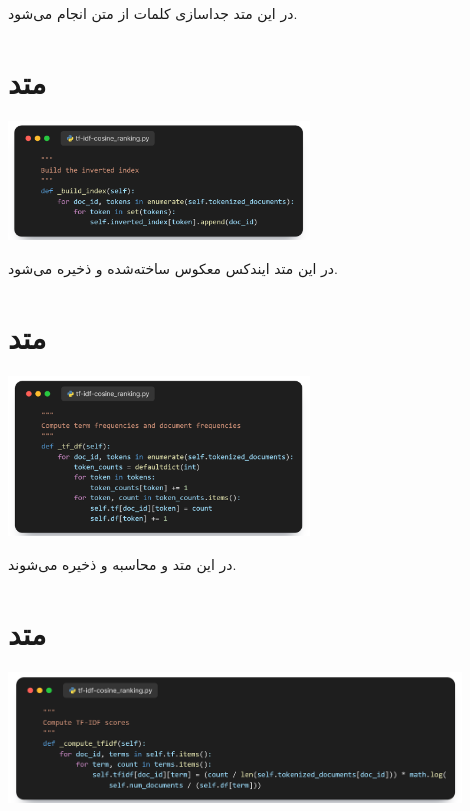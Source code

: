 \documentclass[12pt, dvipsnames, svgnames, x11names,]{article}
\begin{document}
		{\normalsize 
			در این متد جداسازی کلمات از متن انجام می‌شود.
		}
		
	\section{متد }
	
		\begin{center}
			{\includegraphics[width=8cm]{images/05.png}}
		\end{center}
	
		{\normalsize 
			در این متد ایندکس معکوس ساخته‌شده و ذخیره می‌شود.
		}
		
	\section{متد }
		
		\begin{center}
			{\includegraphics[width=8cm]{images/06.png}}
		\end{center}
		
		{\normalsize 
			در این متد  و  محاسبه و ذخیره می‌شوند.
		}
		
	\section{متد }
		
		\begin{center}
			{\includegraphics[width=12cm]{images/07.png}}
		\end{center}
		
\end{document}
